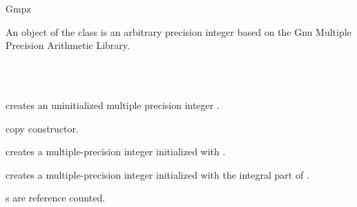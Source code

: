 \begin{ccRefClass} {Gmpz}
\label{Gmpz}

\ccDefinition

An object of the class  is an arbitrary precision integer 
based on the {\sc Gnu} Multiple Precision Arithmetic Library. 


\ccIsModel
{}\\
\\

\ccCreation
{}

             {creates an uninitialized multiple precision integer \ccVar.}

\ccHidden {}
            {copy constructor.}

            {creates a multiple-precision integer initialized with
             .}

            {creates a multiple-precision integer initialized with
             the integral part of .}


\ccImplementation
{}s are reference counted.

\end{ccRefClass} 
